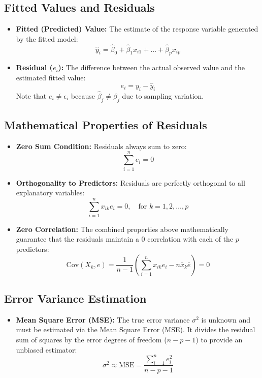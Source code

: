 \documentclass{article}
\begin{document}
\subsection{Fitted Values and Residuals}
\begin{itemize}
    \item \textbf{Fitted (Predicted) Value:} The estimate of the response variable generated by the fitted model:
    $$\hat{y}_i = \hat{\beta}_0 + \hat{\beta}_1 x_{i1} + \dots + \hat{\beta}_p x_{ip}$$
    \item \textbf{Residual ($e_i$):} The difference between the actual observed value and the estimated fitted value:
    $$e_i = y_i - \hat{y}_i$$
    Note that $e_i \neq \epsilon_i$ because $\hat{\beta}_j \neq \beta_j$ due to sampling variation.
\end{itemize}

\subsection{Mathematical Properties of Residuals}
\begin{itemize}
    \item \textbf{Zero Sum Condition:} Residuals always sum to zero:
    $$\sum_{i=1}^{n} e_i = 0$$
    \item \textbf{Orthogonality to Predictors:} Residuals are perfectly orthogonal to all explanatory variables:
    $$\sum_{i=1}^{n} x_{ik} e_i = 0, \quad \text{for } k = 1, 2, \dots, p$$
    \item \textbf{Zero Correlation:} The combined properties above mathematically guarantee that the residuals maintain a $0$ correlation with each of the $p$ predictors:
    $$\text{Cov}(X_k, e) = \frac{1}{n-1}\left(\sum_{i=1}^{n} x_{ik}e_i - n\bar{x}_k\bar{e}\right) = 0$$
\end{itemize}

\subsection{Error Variance Estimation}
\begin{itemize}
    \item \textbf{Mean Square Error (MSE):} The true error variance $\sigma^2$ is unknown and must be estimated via the Mean Square Error (MSE). It divides the residual sum of squares by the error degrees of freedom ($n-p-1$) to provide an unbiased estimator:
    $$\sigma^2 \approx \text{MSE} = \frac{\sum_{i=1}^{n} e_i^2}{n - p - 1}$$
\end{itemize}
\end{document}
